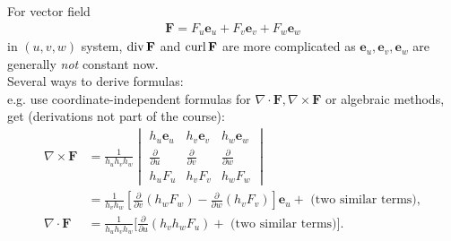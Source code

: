 \documentclass[a4paper]{article}
\begin{document}
For vector field 
\begin{equation*}
\begin{aligned}
\mathbf{F} = F_u \mathbf{e}_u + F_v \mathbf{e}_v + F_w \mathbf{e}_w
\end{aligned}
\end{equation*}
in $\left(u,v,w\right)$ system,
$\operatorname{div} \mathbf{F}$ and $\operatorname{curl} \mathbf{F}$ are more complicated as $\mathbf{e}_u,\mathbf{e}_v,\mathbf{e}_w$ are generally \emph{not} constant now.\\

Several ways to derive formulas:\\
e.g. use coordinate-independent formulas for $\nabla \cdot \mathbf{F},\nabla \times \mathbf{F}$ or algebraic methods, get (derivations not part of the course):
\begin{equation*}
\begin{aligned}
\nabla \times \mathbf{F}&=\frac{1}{h_u h_v h_w}
\begin{vmatrix}
h_u \mathbf{e}_u & h_v \mathbf{e}_v & h_w \mathbf{e}_w\\
\frac{\partial}{\partial u} & \frac{\partial}{\partial v} & \frac{\partial}{\partial w}\\
h_u F_u & h_v F_v & h_w F_w
\end{vmatrix}\\
&= \frac{1}{h_v h_w}[\frac{\partial}{\partial v}\left(h_w F_w\right)-\frac{\partial}{\partial w}\left(h_v F_v\right)]\mathbf{e}_u + \text{  (two similar terms)},\\
\nabla \cdot \mathbf{F} &= \frac{1}{h_u h_v h_w}[\frac{\partial}{\partial u}\left(h_v h_w F_u\right)+ \text{  (two similar terms)]}.
\end{aligned}
\end{equation*}
\end{document}
